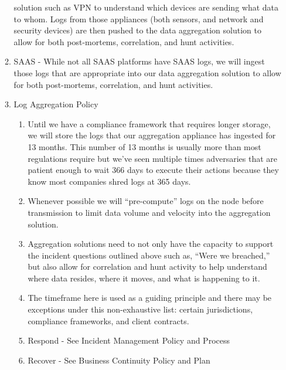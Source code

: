 \documentclass[../main.tex]{subfiles}
\begin{document}
\begin{enumerate}
\begin{enumerate}
        solution such as VPN to understand which devices are sending what data to whom. Logs from those appliances (both sensors, and network and security devices) are then pushed to the
        data aggregation solution to allow for both post-mortems, correlation, and hunt activities.
        \item SAAS - While not all SAAS platforms have SAAS logs, we will ingest those logs that are appropriate into our data aggregation solution to allow for both post-mortems,
        correlation, and hunt activities.
        \item Log Aggregation Policy
        \begin{enumerate}
            \item Until we have a compliance framework that requires longer storage, we will store the logs that our aggregation appliance has ingested for 13 months.
            This number of 13 months is usually more than most regulations require but we've seen multiple times adversaries that are patient enough to wait 366 days to execute their actions
            because they know most companies shred logs at 365 days.
            \item Whenever possible we will “pre-compute” logs on the node before transmission to limit data volume and velocity into the aggregation solution.
            \item Aggregation solutions need to not only have the capacity to support the incident questions outlined above such as, “Were we breached,” but also allow for correlation and hunt activity to help understand where data resides, where it moves, and what is happening to it.
            \item The timeframe here is used as a guiding principle and there may be exceptions under this non-exhaustive list: certain jurisdictions, compliance frameworks, and client contracts.
            \item Respond - See Incident Management Policy and Process
            \item Recover - See Business Continuity Policy and Plan
        \end{enumerate}
    \end{enumerate}
\end{enumerate}
\end{document}
